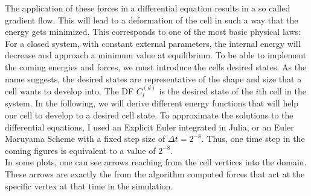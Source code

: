 \documentclass[a4paper,12pt,leqno]{article}
\theoremstyle{plain}
\theoremstyle{remark}
\begin{document}
The application of these forces in a differential equation results in a so called gradient flow. This will lead to a deformation of the cell in such a way that the energy gets minimized. This corresponds to one of the most basic physical laws: For a closed system, with constant external parameters, the internal energy will decrease and approach a minimum value at equilibrium. 
To be able to implement the coming energies and forces, we must introduce the cells desired states. As the name suggests, the desired states are representative of the shape and size that a cell wants to develop into. The DF $C_i^{(d)}$ is the desired state of the $i$th cell in the system. 
In the following, we will derive different energy functions that will help our cell to develop to a desired cell state. 
To approximate the solutions to the differential equations, I used an Explicit Euler integrated in Julia, or an Euler Maruyama Scheme with a fixed step size of $\Delta t = 2^{-8}$. Thus, one time step in the coming figures is equivalent to a value of $2^{-8}$. \\
In some plots, one can see arrows reaching from the cell vertices into the domain. These arrows are exactly the from the algorithm computed forces that act at the specific vertex at that time in the simulation. 
 
\end{document}
